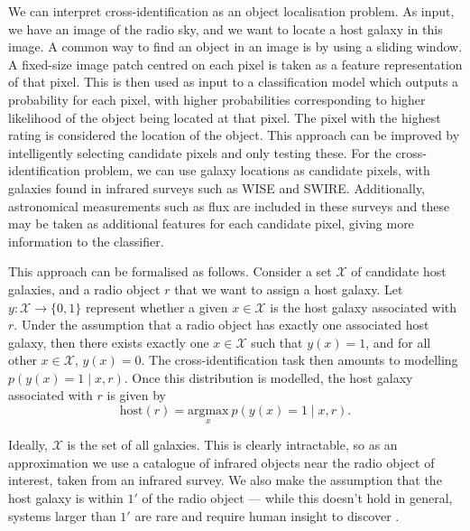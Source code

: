   We can interpret cross-identification as an object localisation problem. As
  input, we have an image of the radio sky, and we want to locate a host galaxy
  in this image. A common way to find an object in an image is by using a
  sliding window. A fixed-size image patch centred on each pixel is taken as a
  feature representation of that pixel. This is then used as input to a
  classification model which outputs a probability for each pixel, with higher
  probabilities corresponding to higher likelihood of the object being located
  at that pixel. The pixel with the highest rating is considered the location
  of the object. This approach can be improved by intelligently selecting
  candidate pixels and only testing these. For the cross-identification
  problem, we can use galaxy locations as candidate pixels, with galaxies found
  in infrared surveys such as WISE and SWIRE. Additionally, astronomical
  measurements such as flux are included in these surveys and these may be
  taken as additional features for each candidate pixel, giving more
  information to the classifier.

  This approach can be formalised as follows. Consider a set $\mathcal X$ of
  candidate host galaxies, and a radio object $r$ that we want to assign a
  host galaxy. Let $y : \mathcal X \to \{0, 1\}$ represent whether a given $x
  \in \mathcal X$ is the host galaxy associated with $r$. Under the assumption
  that a radio object has exactly one associated host galaxy, then there exists
  exactly one $x \in \mathcal X$ such that $y(x) = 1$, and for all other $x \in
  \mathcal X$, $y(x) = 0$. The cross-identification task then amounts to
  modelling $p(y(x) = 1 \mid x, r)$. Once this distribution is modelled, the
  host galaxy associated with $r$ is given by
  \begin{equation}
      \label{eq:cross-identification}
      \mbox{host}(r) = \underset{x}{\mbox{argmax}}\ p(y(x) = 1 \mid x, r).
  \end{equation}

  Ideally, $\mathcal X$ is the set of all galaxies. This is clearly
  intractable, so as an approximation we use a catalogue of infrared objects
  near the radio object of interest, taken from an infrared survey. We also
  make the assumption that the host galaxy is within $1'$ of the radio object
  --- while this doesn't hold in general, systems larger than $1'$ are rare and
  require human insight to discover \citep{banfield16}.


